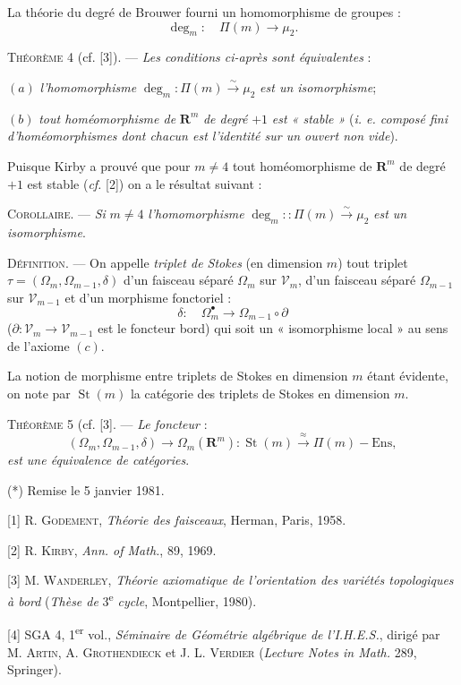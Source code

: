 La théorie du degré de Brouwer fourni un homomorphisme de groupes :
\[
\deg_m:\quad\Pi(m)\to\mu_2.
\]

\textsc{Théorème} 4 (cf. [3]). --- \textit{Les conditions ci-après sont équivalentes} :

$(a)$ \textit{l'homomorphisme} $\deg_m:\Pi(m)\overset{\sim}{\to}\mu_2$ \textit{est un isomorphisme};

$(b)$ \textit{tout homéomorphisme de} $\mathbf{R}^m$ \textit{de degré} $+1$ \textit{est « stable »} (\textit{i. e. composé fini d'homéomorphismes dont chacun est l'identité sur un ouvert non vide}).

Puisque Kirby a prouvé que pour $m\ne4$ tout homéomorphisme de $\mathbf{R}^m$ de degré $+1$ est stable (\textit{cf.} [2]) on a le résultat suivant :

\textsc{Corollaire}. --- \textit{Si} $m\ne4$ \textit{l'homomorphisme} $\deg_m::\Pi(m)\overset{\sim}{\to}\mu_2$ \textit{est un isomorphisme}.

\textsc{Définition}. --- On appelle \textit{triplet de Stokes} (en dimension $m$) tout triplet $\tau=(\Omega_m,\Omega_{m-1},\delta)$ d'un faisceau séparé $\Omega_m$ sur $\mathscr{V}_m$, d'un faisceau séparé $\Omega_{m-1}$ sur $\mathscr{V}_{m-1}$ et d'un morphisme fonctoriel :
\[
\delta:\quad\Omega_m^{\bullet}\to\Omega_{m-1}\circ\partial
\]
($\partial:\mathscr{V}_m\to\mathscr{V}_{m-1}$ est le foncteur bord) qui soit un « isomorphisme local » au sens de l'axiome $(c)$.

La notion de morphisme entre triplets de Stokes en dimension $m$ étant évidente, on note par $\operatorname{St}(m)$ la catégorie des triplets de Stokes en dimension $m$.

\textsc{Théorème} 5 (cf. [3]. --- \textit{Le foncteur} :
\[
(\Omega_m,\Omega_{m-1},\delta)\to\Omega_m(\mathbf{R}^m):\operatorname{St}(m)\overset{\approx}{\to}\Pi(m)-\mathrm{Ens},
\]
\textit{est une équivalence de catégories}.

(*) Remise le 5 janvier 1981.

[1] R. \textsc{Godement}, \textit{Théorie des faisceaux}, Herman, Paris, 1958.

[2] R. \textsc{Kirby}, \textit{Ann. of Math.}, 89, 1969.

[3] M. \textsc{Wanderley}, \textit{Théorie axiomatique de l'orientation des variétés topologiques à bord} (\textit{Thèse de} 3\textsuperscript{e} \textit{cycle}, Montpellier, 1980).

[4] SGA 4, 1\textsuperscript{er} vol., \textit{Séminaire de Géométrie algébrique de l'I.H.E.S.}, dirigé par M. \textsc{Artin}, A. \textsc{Grothendieck} et J. L. \textsc{Verdier} (\textit{Lecture Notes in Math.} 289, Springer).


